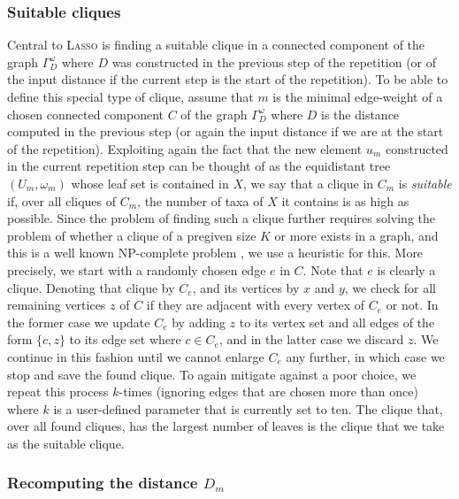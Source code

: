 \subsubsection{Suitable cliques}
\label{sec:cliques}
Central to \textsc{Lasso} is finding a suitable clique in a connected component
of the graph $\Gamma^{\omega}_D$ where $D$ was constructed in the previous
step of the repetition (or of the input distance if the current step is the
start of the repetition). To be able to define this special type of clique,
assume that $m$ is the minimal edge-weight of a chosen connected component $C$
of the graph $\Gamma^{\omega}_D$ where $D$ is the distance computed in the
previous step (or again the input distance if we are at the start of the
repetition). Exploiting again the fact that the new element $u_m$ constructed
in the current repetition step can be thought of as the equidistant tree
$(U_m,\omega_m)$ whose leaf set is contained in $X$, we say that a clique in
$C_m$ is {\em suitable} if, over all cliques of $C_m$, the number of taxa of
$X$ it contains is as high as possible. Since the problem of finding such a
clique further requires solving the problem of whether a clique of a pregiven
size $K$ or more exists in a graph, and this is a well known NP-complete
problem \cite{gareyjohnson79}, we use a heuristic for this. More precisely, we
start with a randomly chosen edge $e$ in $C$. Note that $e$ is clearly a
clique. Denoting that clique by $C_e$, and its vertices by $x$ and $y$, we
check for all remaining vertices $z$ of $C$ if they are adjacent with every
vertex of $C_e$ or not. In the former case we update $C_e$ by adding $z$ to
its vertex set and all edges of the form $\{c,z\}$ to its edge set where $c\in
C_e$, and in the latter case we discard $z$.  We continue in this fashion
until we cannot enlarge $C_e$ any further, in which case we stop and save the
found clique. To again mitigate against a poor choice, we repeat this process
$k$-times (ignoring edges that are chosen more than once) where $k$ is a
user-defined parameter that is currently set to ten. The clique that, over all
found cliques, has the largest number of leaves is the clique that we take as
the suitable clique.

\subsubsection{Recomputing the distance $D_m$}
\label{sec:collapsinng-edges}

